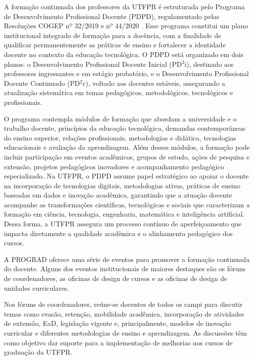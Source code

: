 A formação continuada dos professores da UTFPR é estruturada pelo Programa de Desenvolvimento Profissional Docente (PDPD), regulamentado pelas Resoluções COGEP nº 32/2019 e nº 44/2020 \cite{UTFPR_Desenvolvimento_2019}. Esse programa constitui um plano institucional integrado de formação para a docência, com a finalidade de qualificar permanentemente as práticas de ensino e fortalecer a identidade docente no contexto da educação tecnológica. O PDPD está organizado em dois planos: o Desenvolvimento Profissional Docente Inicial (PD$^2$i), destinado aos professores ingressantes e em estágio probatório, e o Desenvolvimento Profissional Docente Continuado (PD$^2$c), voltado aos docentes estáveis, assegurando a atualização sistemática em temas pedagógicos, metodológicos, tecnológicos e profissionais.

O programa contempla módulos de formação que abordam a universidade e o trabalho docente, princípios da educação tecnológica, demandas contemporâneas do ensino superior, relações profissionais, metodologias e didática, tecnologias educacionais e avaliação da aprendizagem. Além desses módulos, a formação pode incluir participação em eventos acadêmicos, grupos de estudo, ações de pesquisa e extensão, projetos pedagógicos inovadores e acompanhamento pedagógico especializado. Na UTFPR, o PDPD assume papel estratégico ao apoiar o docente na incorporação de tecnologias digitais, metodologias ativas, práticas de ensino baseadas em dados e inovação acadêmica, garantindo que a atuação docente acompanhe as transformações científicas, tecnológicas e sociais que caracterizam a formação em ciência, tecnologia, engenharia, matemática e inteligência artificial. Dessa forma, a UTFPR assegura um processo contínuo de aperfeiçoamento que impacta diretamente a qualidade acadêmica e o alinhamento pedagógico dos cursos.

A PROGRAD oferece uma série de eventos para promover a formação continuada do docente. Alguns dos eventos institucionais de maiores destaques são os fóruns de coordenadores, as oficinas de design de cursos e as oficinas de design de unidades curriculares.

Nos fóruns de coordenadores, reúne-se docentes de todos os campi para discutir temas como evasão, retenção, mobilidade acadêmica, incorporação de atividades de extensão, EaD, legislação vigente e, principalmente, modelos de inovação curricular e diferentes metodologias de ensino e aprendizagem. As discussões têm como objetivo dar suporte para a implementação de melhorias nos cursos de graduação da UTFPR.

